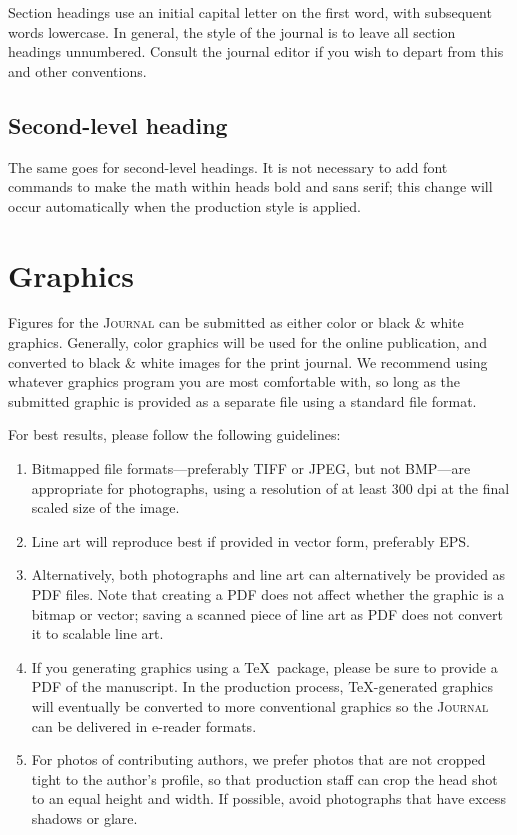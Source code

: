 \documentclass{article}
\theoremstyle{theorem}
\theoremstyle{definition}
\begin{document}
Section headings use an initial capital letter on the first word, with subsequent words lowercase.  In general, the style of the journal is to leave all section headings unnumbered.  Consult the journal editor if you wish to depart from this and other conventions.

\subsection{Second-level heading}

The same goes for second-level headings.  It is not necessary to add font commands to make the math within heads bold and sans serif; this change will occur automatically when the production style is applied.

\section{Graphics}

Figures for the \textsc{Journal} can be submitted as either color or black \& white graphics.  Generally, color graphics will be used for the online publication, and converted to black \& white images for the print journal.  We recommend using whatever graphics program you are most comfortable with, so long as the submitted graphic is provided as a separate file using a standard file format.

For best results, please follow the following guidelines:
\begin{enumerate}
\item Bitmapped file formats---preferably TIFF or JPEG, but not BMP---are appropriate for photographs, using a resolution of at least 300 dpi at the final scaled size of the image.
\item Line art will reproduce best if provided in vector form, preferably EPS.
\item Alternatively, both photographs and line art can alternatively be provided as PDF files.  Note that creating a PDF does not affect whether the graphic is a bitmap or vector; saving a scanned piece of line art as PDF does not convert it to scalable line art.
\item If you generating graphics using a \TeX\ package, please be sure to provide a PDF of the manuscript.  In the production process, \TeX-generated graphics will eventually be converted to more conventional graphics so the \textsc{Journal} can be delivered in e-reader formats.
\item For photos of contributing authors, we prefer photos that are not cropped tight to the author's profile, so that production staff can crop the head shot to an equal height and width.  If possible, avoid photographs that have excess shadows or glare.
\end{enumerate}
\end{document}
